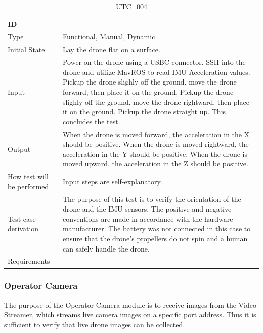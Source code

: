 \documentclass[12pt, titlepage]{article}
\begin{document}
\begin{table}[!h]
\begin{center}
\caption {UTC\_004}
\label{tab:UTC_004}
\begin{tabular}{ | m{3.2cm} | m{12.2cm} | } 
\hline
ID & \nameref{tab:UTC_004} \\ 
\hline
Type &  Functional, Manual, Dynamic  \\ 
\hline
Initial State & Lay the drone flat on a surface.\\ 
\hline
Input & Power on the drone using a USBC connector. SSH into the drone and utilize MavROS to read IMU Acceleration values. Pickup the drone slighly off the ground, move the drone forward, then place it on the ground. Pickup the drone slighly off the ground, move the drone rightward, then place it on the ground. Pickup the drone straight up. This concludes the test.\\ 
\hline
Output &  When the drone is moved forward, the acceleration in the X should be positive. When the drone is moved rightward, the acceleration in the Y should be positive. When the drone is moved upward, the acceleration in the Z should be positive.\\ 
\hline
How test will be performed & Input steps are self-explanatory.  \\ 
\hline
Test case derivation & The purpose of this test is to verify the orientation of the drone and the IMU sensors. The positive and negative conventions are made in accordance with the hardware manufacturer. The battery was not connected in this case to ensure that the drone's propellers do not spin and a human can safely handle the drone. \\ 
\hline
Requirements &  \\ 
\hline
\end{tabular}
\end{center}
\end{table}

\subsubsection{Operator Camera}

The purpose of the Operator Camera module is to receive images from the Video Streamer, which streams live camera images on a specific port address. Thus it is sufficient to verify that live drone images can be collected.
\end{document}
